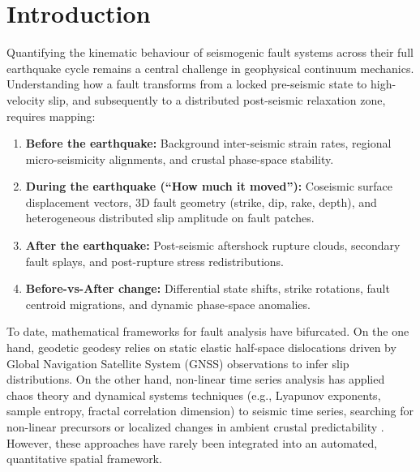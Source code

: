 \documentclass[11pt,a4paper]{article}
\begin{document}
\section{Introduction}
Quantifying the kinematic behaviour of seismogenic fault systems across their full earthquake cycle remains a central challenge in geophysical continuum mechanics. Understanding how a fault transforms from a locked pre-seismic state to high-velocity slip, and subsequently to a distributed post-seismic relaxation zone, requires mapping:
\begin{enumerate}
    \item \textbf{Before the earthquake:} Background inter-seismic strain rates, regional micro-seismicity alignments, and crustal phase-space stability.
    \item \textbf{During the earthquake (``How much it moved''):} Coseismic surface displacement vectors, 3D fault geometry (strike, dip, rake, depth), and heterogeneous distributed slip amplitude on fault patches.
    \item \textbf{After the earthquake:} Post-seismic aftershock rupture clouds, secondary fault splays, and post-rupture stress redistributions.
    \item \textbf{Before-vs-After change:} Differential state shifts, strike rotations, fault centroid migrations, and dynamic phase-space anomalies.
\end{enumerate}

To date, mathematical frameworks for fault analysis have bifurcated. On the one hand, geodetic geodesy relies on static elastic half-space dislocations \cite{okada1985} driven by Global Navigation Satellite System (GNSS) observations to infer slip distributions. On the other hand, non-linear time series analysis has applied chaos theory and dynamical systems techniques (e.g., Lyapunov exponents, sample entropy, fractal correlation dimension) to seismic time series, searching for non-linear precursors or localized changes in ambient crustal predictability \cite{wolf1985, rosenstein1993, sarwar2023}. However, these approaches have rarely been integrated into an automated, quantitative spatial framework.
\end{document}
